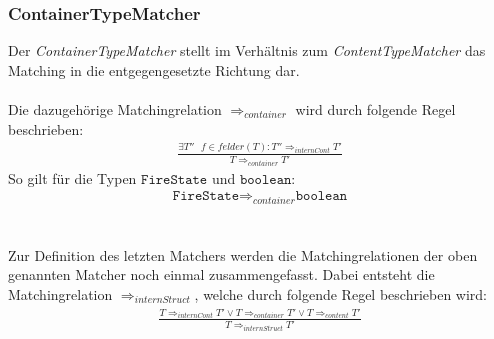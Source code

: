 \subsubsection{ContainerTypeMatcher}
Der \emph{ContainerTypeMatcher} stellt im Verhältnis zum \emph{ContentTypeMatcher} das Matching in die entgegengesetzte Richtung dar.
\\\\
Die dazugehörige Matchingrelation $\Rightarrow_{container}$ wird durch folgende Regel beschrieben:
\begin{gather*}
\frac{\exists \mathit{T''\text{ }f}\in felder(T): T'' \Rightarrow_{internCont} T'}{T \Rightarrow_{container} T'}
\end{gather*}
\noindent
So gilt für die Typen $\texttt{FireState}$ und $\texttt{boolean}$: 
\begin{gather*}
\texttt{FireState} \Rightarrow_{container} \texttt{boolean}
\end{gather*}
\\\\
Zur Definition des letzten Matchers werden die Matchingrelationen der oben genannten Matcher noch einmal zusammengefasst. Dabei entsteht die Matchingrelation $\Rightarrow_{internStruct}$, welche durch folgende Regel beschrieben wird:
\begin{gather*}
\frac{T \Rightarrow_{internCont}T' \vee T \Rightarrow_{container} T' \vee T \Rightarrow_{content} T'}{T \Rightarrow_{internStruct}T'}
\end{gather*}
